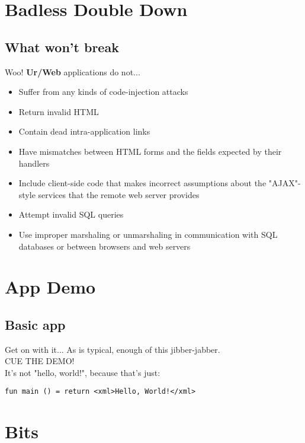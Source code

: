 \documentclass{beamer}
\begin{document}
\section{Badless Double Down}
\subsection{What won't break}
\begin{frame}{Woo!}
\textbf{Ur/Web} applications do not...

\begin{itemize}
\item Suffer from any kinds of code-injection attacks
\item Return invalid HTML
\item Contain dead intra-application links
\item Have mismatches between HTML forms and the fields expected by their handlers
\item Include client-side code that makes incorrect assumptions about the "AJAX"-style services that the remote web server provides
\item Attempt invalid SQL queries
\item Use improper marshaling or unmarshaling in communication with SQL databases or between browsers and web servers
\end{itemize}
\end{frame}


\section{App Demo}
\subsection{Basic app}
\begin{frame}[fragile]{Get on with it...}
As is typical, enough of this jibber-jabber.\\

CUE THE DEMO!\\

It's not "hello, world!", because that's just:
\begin{verbatim}
fun main () = return <xml>Hello, World!</xml>
\end{verbatim}
\end{frame}

\section{Bits}
\end{document}

